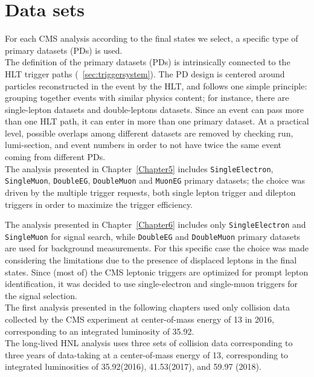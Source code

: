 \section{Data sets}\label{sec:c4data}

For each CMS analysis according to the final states we 
select, a specific type of primary datasets (PDs) is used.\\
The definition of the primary datasets (PDs) is intrinsically connected to
the HLT trigger paths (~\ref{sec:triggersystem}). The PD design is centered
around particles reconstructed in the event by the HLT, and follows one simple principle:
grouping together events with similar physics content; for instance, there are
single-lepton datasets and double-leptons datasets.
Since an event can pass more than one HLT path,
it can enter in more than one primary dataset. At a practical level, possible overlaps among different datasets are
removed by checking run, lumi-section, and event numbers in order to not have twice the same event coming from different PDs.\\


The analysis presented in Chapter~\ref{Chapter5} includes
\texttt{SingleElectron}, \texttt{SingleMuon}, \texttt{DoubleEG},
\texttt{DoubleMuon} and \texttt{MuonEG} primary datasets; the choice was driven by the
multiple trigger requests, both single lepton trigger and
dilepton triggers in order to maximize the trigger efficiency.

The analysis presented in Chapter~\ref{Chapter6} includes only
\texttt{SingleElectron} and \texttt{SingleMuon} for signal search,
while \texttt{DoubleEG} and
\texttt{DoubleMuon} primary datasets are used for background
measurements. For this specific case the choice was
made considering the limitations due to the presence of displaced
leptons in the final states.
Since (most of) the CMS leptonic triggers are
optimized for prompt lepton identification, it was decided
to use single-electron and single-muon triggers for the
signal selection.\\

The first analysis presented in the following chapters used only 
\Pp collision data collected
by the CMS experiment at center-of-mass energy of 13\TeV
in 2016, corresponding to an integrated luminosity of 35.92\fbinv.\\

The long-lived HNL analysis uses three sets of \Pp collision data
corresponding to three years of data-taking at a
center-of-mass energy of 13\TeV, corresponding to integrated
luminosities of 35.92\fbinv (2016), 41.53\fbinv (2017), and 59.97\fbinv
(2018). 

